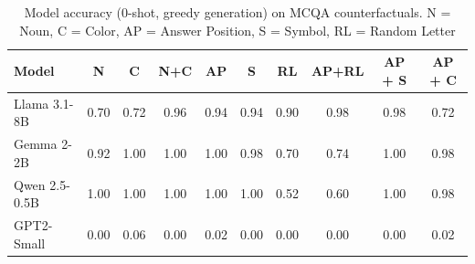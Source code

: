 \documentclass{article}
\theoremstyle{plain}
\theoremstyle{definition}
\theoremstyle{remark}
\begin{document}


\begin{table}[h]
    \centering
    \caption{Model accuracy (0-shot, greedy generation) on MCQA counterfactuals. N = Noun, C = Color, AP = Answer Position, S = Symbol, RL = Random Letter}
    \begin{tabular}{l|ccccccccc}
        \toprule
        \textbf{Model} & \textbf{N} & \textbf{C} & \textbf{N+C} & \textbf{AP} & \textbf{S} & \textbf{RL}  & \textbf{AP+RL} & \textbf{AP + S} & \textbf{AP + C} \\ 
        \midrule
        Llama 3.1-8B   & 0.70 & 0.72 & 0.96 & 0.94 & 0.94 & 0.90 & 0.98 & 0.98 & 0.72 \\
        Gemma 2-2B    & 0.92 & 1.00 & 1.00 & 1.00 & 0.98 & 0.70 & 0.74 & 1.00 & 0.98 \\
        Qwen 2.5-0.5B  & 1.00 & 1.00 & 1.00 & 1.00 & 1.00 & 0.52 & 0.60 & 1.00 & 0.98 \\
        GPT2-Small     & 0.00 & 0.06 & 0.00 & 0.02 & 0.00 & 0.00 & 0.00 & 0.00 & 0.02 \\
        \bottomrule
    \end{tabular}
    \label{tab:mcqa_counterfactual}
\end{table}
\end{document}
